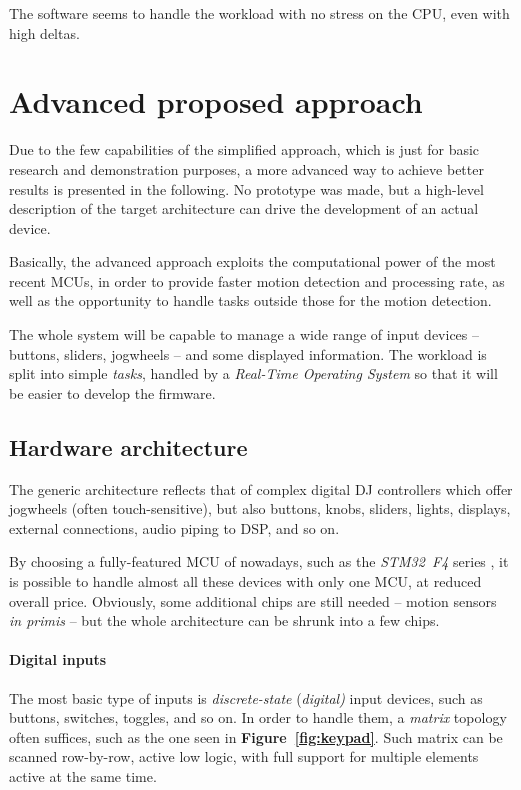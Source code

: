 \documentclass[a4paper,10pt]{article}
\newcommand{\citef}[1]{\textbf{Figure~\ref{#1}}}
\begin{document}
\begin{multicols}{2}
The software seems to handle the workload with no stress on the CPU, even with
high deltas.


\section{Advanced proposed approach}
\label{sec:advanced_approach}

Due to the few capabilities of the simplified approach, which is just for
basic research and demonstration purposes, a more advanced way to achieve
better results is presented in the following. No prototype was made, but a
high-level description of the target architecture can drive the development
of an actual device.

Basically, the advanced approach exploits the computational power of the most
recent MCUs, in order to provide faster motion detection and processing rate,
as well as the opportunity to handle tasks outside those for the motion
detection.

The whole system will be capable to manage a wide range of input devices --
buttons, sliders, jogwheels -- and some displayed information. The workload is
split into simple \emph{tasks}, handled by a \emph{Real-Time Operating System}
so that it will be easier to develop the firmware.


\subsection{Hardware architecture}

The generic architecture reflects that of complex digital DJ controllers
which offer jogwheels (often touch-sensitive), but also buttons, knobs,
sliders, lights, displays, external connections, audio piping to DSP, and so
on.

By choosing a fully-featured MCU of nowadays, such as the \emph{STM32~F4}
series \cite{st_stm32f4}, it is possible to handle almost all these devices
with only one MCU, at reduced overall price. Obviously, some additional chips
are still needed -- motion sensors \emph{in primis} -- but the whole
architecture can be shrunk into a few chips.


\paragraph{Digital inputs}
The most basic type of inputs is \emph{discrete-state} (\emph{digital)} input
devices, such as buttons, switches, toggles, and so on. In order to handle
them, a \emph{matrix} topology often suffices, such as the one seen in
\citef{fig:keypad}. Such matrix can be scanned row-by-row, active low logic,
with full support for multiple elements active at the same time.


\end{multicols}
\end{document}
